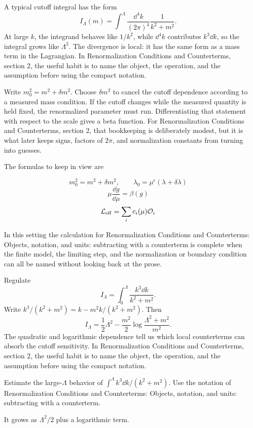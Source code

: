 A typical cutoff integral has the form
\[
  I_\Lambda(m)=\int^{\Lambda}\frac{\dd^4k}{(2\pi)^4}\frac{1}{k^2+m^2}.
\]
At large \(k\), the integrand behaves like \(1/k^2\), while \(\dd^4k\) contributes \(k^3\dd k\), so the integral grows like \(\Lambda^2\).  The divergence is local: it has the same form as a mass term in the Lagrangian.  In Renormalization Conditions and Counterterms, section 2, the useful habit is to name the object, the operation, and the assumption before using the compact notation.

Write \(m_0^2=m^2+\delta m^2\).  Choose \(\delta m^2\) to cancel the cutoff dependence according to a measured mass condition.  If the cutoff changes while the measured quantity is held fixed, the renormalized parameter must run.  Differentiating that statement with respect to the scale gives a beta function.  For Renormalization Conditions and Counterterms, section 2, that bookkeeping is deliberately modest, but it is what later keeps signs, factors of \(2\pi\), and normalization constants from turning into guesses.

The formulas to keep in view are

\[
  m_0^2=m^2+\delta m^2,\qquad \lambda_0=\mu^\epsilon(\lambda+\delta\lambda)
\]
\[
  \mu\frac{\dd g}{\dd\mu}=\beta(g)
\]
\[
  \mathcal L_{\mathrm{eff}}=\sum_i c_i(\mu)\mathcal O_i
\]

In this setting the calculation for Renormalization Conditions and Counterterms: Objects, notation, and units: subtracting with a counterterm is complete when the finite model, the limiting step, and the normalization or boundary condition can all be named without looking back at the prose.




\begin{example}
Regulate
\[
  I_\Lambda=\int_0^\Lambda\frac{k^3\dd k}{k^2+m^2}.
\]
Write \(k^3/(k^2+m^2)=k-m^2k/(k^2+m^2)\).  Then
\[
  I_\Lambda=\frac12\Lambda^2-\frac{m^2}{2}\log\frac{\Lambda^2+m^2}{m^2}.
\]
The quadratic and logarithmic dependence tell us which local counterterms can absorb the cutoff sensitivity.  In Renormalization Conditions and Counterterms, section 2, the useful habit is to name the object, the operation, and the assumption before using the compact notation.
\end{example}



\begin{exercise}
Estimate the large-\(\Lambda\) behavior of \(\int^\Lambda k^3\dd k/(k^2+m^2)\).  Use the notation of Renormalization Conditions and Counterterms: Objects, notation, and units: subtracting with a counterterm.
\begin{answer}
It grows as \(\Lambda^2/2\) plus a logarithmic term.
\end{answer}
\end{exercise}

